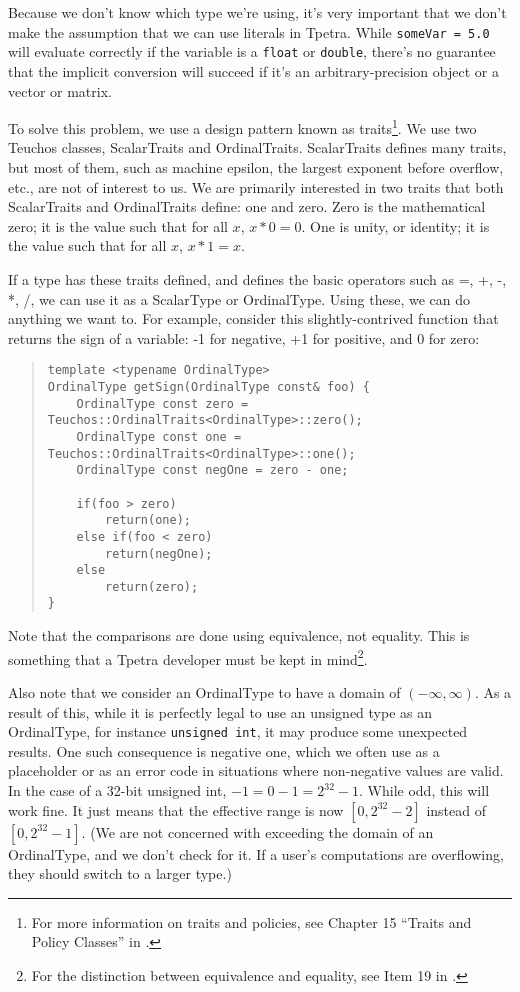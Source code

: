 \documentclass[10pt,relax]{TpetraDesign}
\begin{document}
Because we don't know which type we're using, it's very important that we don't make the assumption that we can use literals in Tpetra. While \texttt{someVar = 5.0} will evaluate correctly if the variable is a \texttt{float} or \texttt{double}, there's no guarantee that the implicit conversion will succeed if it's an arbitrary-precision object or a vector or matrix.

To solve this problem, we use a design pattern known as traits\footnote{For more information on traits and policies, see Chapter 15 ``Traits and Policy Classes'' in \cite{Templates-Complete-Guide}.}. We use two Teuchos classes, ScalarTraits and OrdinalTraits. ScalarTraits defines many traits, but most of them, such as machine epsilon, the largest exponent before overflow, etc., are not of interest to us. We are primarily interested in two traits that both ScalarTraits and OrdinalTraits define: one and zero. Zero is the mathematical zero; it is the value such that for all $x$, $x * 0 = 0$. One is unity, or identity; it is the value such that for all $x$, $x * 1 = x$.


If a type has these traits defined, and defines the basic operators such as =, +, -, *, /, we can use it as a ScalarType or OrdinalType. Using these, we can do anything we want to. For example, consider this slightly-contrived function that returns the sign of a variable: -1 for negative, +1 for positive, and 0 for zero:
\begin{quote}
\begin{verbatim}
template <typename OrdinalType>
OrdinalType getSign(OrdinalType const& foo) {
    OrdinalType const zero = Teuchos::OrdinalTraits<OrdinalType>::zero();
    OrdinalType const one = Teuchos::OrdinalTraits<OrdinalType>::one();
    OrdinalType const negOne = zero - one;
    
    if(foo > zero)
        return(one);
    else if(foo < zero)
        return(negOne);
    else
        return(zero);
}
\end{verbatim}
\end{quote}
Note that the comparisons are done using equivalence, not equality. This is something that a Tpetra developer must be kept in mind\footnote{For the distinction between equivalence and equality, see Item 19 in \cite{Effective-STL}.}. 

Also note that we consider an OrdinalType to have a domain of $\left( -\infty, \infty \right)$. As a result of this, while it is perfectly legal to use an unsigned type as an OrdinalType, for instance \texttt{unsigned int}, it may produce some unexpected results. One such consequence is negative one, which we often use as a placeholder or as an error code in situations where non-negative values are valid. In the case of a 32-bit unsigned int, $-1 = 0 - 1 = 2^{32} - 1$. While odd, this will work fine. It just means that the effective range is now $\left[ 0, 2^{32} - 2 \right]$ instead of $\left[ 0, 2^{32} - 1 \right]$. (We are not concerned with exceeding the domain of an OrdinalType, and we don't check for it. If a user's computations are overflowing, they should switch to a larger type.)
\end{document}
